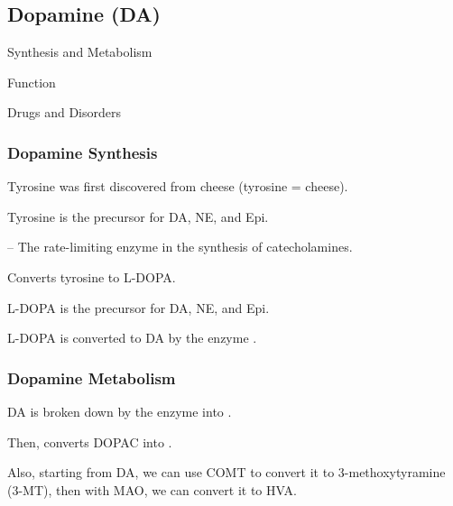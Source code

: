 \subsection{Dopamine (DA)}

\begin{coloredlist}
    \item Synthesis and Metabolism
    \item Function
    \item Drugs and Disorders
\end{coloredlist}

\subsubsection{Dopamine Synthesis}

\begin{coloredlist}
    \item Tyrosine was first discovered from cheese (tyrosine = cheese).
    \begin{coloredlist}
        \item Tyrosine is the precursor for DA, NE, and Epi.
        \item {} -- The rate-limiting enzyme in the synthesis of catecholamines.
        \begin{coloredlist}
            \item Converts tyrosine to L-DOPA.
            \item L-DOPA is the precursor for DA, NE, and Epi.
        \end{coloredlist}
        \item L-DOPA is converted to DA by the enzyme .
    \end{coloredlist}
\end{coloredlist}

\subsubsection{Dopamine Metabolism}

\begin{coloredlist}
    \item DA is broken down by the enzyme  into .
    \item Then,  converts DOPAC into .
    \item Also, starting from DA, we can use COMT to convert it to 3-methoxytyramine (3-MT), then with MAO, we can convert it to HVA. 
\end{coloredlist}

